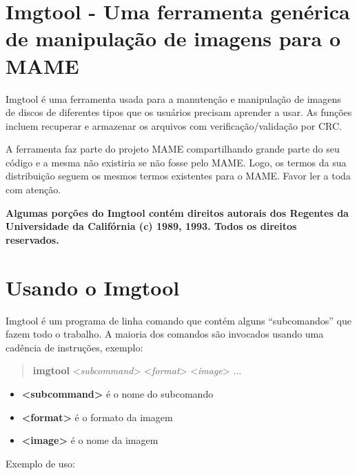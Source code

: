 \documentclass[letterpaper,10pt,brazil]{sphinxmanual}
\begin{document}
\section{Imgtool - Uma ferramenta genérica de manipulação de imagens para o MAME}
\label{tools/imgtool:imgtool-uma-ferramenta-generica-de-manipulacao-de-imagens-para-o-mame}\label{tools/imgtool::doc}
Imgtool é uma ferramenta usada para a manutenção e manipulação de
imagens de discos de diferentes tipos que os usuários precisam aprender
a usar. As funções incluem recuperar e armazenar os arquivos com
verificação/validação por CRC.

A ferramenta faz parte do projeto MAME compartilhando grande parte do
seu código e a mesma não existiria se não fosse pelo MAME.
Logo, os termos da sua distribuição seguem os mesmos termos existentes
para o MAME. Favor ler a toda {\hyperref[license:mame\string-license]{}} com atenção.

\textbf{Algumas porções do Imgtool contém direitos autorais dos Regentes da
Universidade da Califórnia (c) 1989, 1993.
Todos os direitos reservados.}


\section{Usando o Imgtool}
\label{tools/imgtool:usando-o-imgtool}
Imgtool é um programa de linha comando que contém alguns ``subcomandos''
que fazem todo o trabalho. A maioria dos comandos são invocados usando
uma cadência de instruções, exemplo:
\begin{quote}

\textbf{imgtool} \textless{}\emph{subcommand}\textgreater{} \textless{}\emph{format}\textgreater{} \textless{}\emph{image}\textgreater{} ...
\end{quote}
\begin{itemize}
\item {} 
\textbf{\textless{}subcommand\textgreater{}} é o nome do subcomando

\item {} 
\textbf{\textless{}format\textgreater{}} é o formato da imagem

\item {} 
\textbf{\textless{}image\textgreater{}} é o nome da imagem

\end{itemize}

Exemplo de uso:

\begin{DUlineblock}{0em}
\item[] 
\item[] 
\item[] 
\end{DUlineblock}
\end{document}
